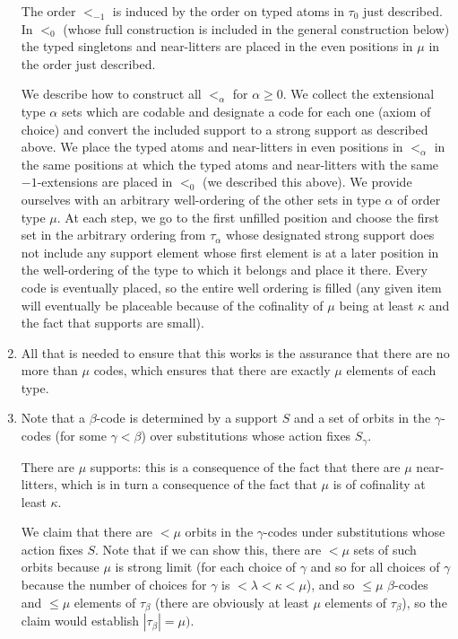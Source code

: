\documentclass[12pt]{article}
\begin{document}
\begin{enumerate}
The order $<_{-1}$
is induced by the order on typed atoms in $\tau_0$ just described.  In $<_0$ (whose full construction is included in the general construction below) the typed singletons and near-litters are placed in the even positions in $\mu$ in the order just described.

We describe how to construct all $<_\alpha$ for $\alpha\geq 0$.  We collect the extensional type $\alpha$ sets which are codable and designate a code for each one (axiom of choice) and convert the included support to a strong support as described above. We place the typed atoms and near-litters in even positions in $<_\alpha$ in the same positions at which the typed atoms and near-litters with the same $-1$-extensions are placed in
$<_0$ (we described this above).  We provide ourselves with an arbitrary well-ordering of the other sets in type $\alpha$ of order type $\mu$.  At each step, we go to the first unfilled position and choose the first set in the arbitrary ordering from $\tau_\alpha$ whose designated strong support does not include any support element whose first element is at a later position in the well-ordering of the type to which it belongs and place it there.  Every code is eventually placed, so the entire well ordering is filled (any given item will eventually be placeable because of the cofinality of $\mu$ being at least $\kappa$ and the fact that supports are small).

\item All that is needed to ensure that this works is the assurance that there are no more than $\mu$ codes, which ensures that there are exactly $\mu$ elements of each type.

\item  Note that a $\beta$-code is determined by a support $S$ and a set of orbits in the $\gamma$-codes (for some $\gamma<\beta$) over substitutions whose action fixes $S_\gamma$.

There are $\mu$ supports:  this is a consequence of the fact that there are $\mu$ near-litters, which is in turn a consequence of the fact that $\mu$ is of cofinality at least $\kappa$.

We claim that there are $<\mu$ orbits in the $\gamma$-codes under substitutions whose action fixes $S$.  Note that if we can show this, there are $<\mu$ sets of such orbits because $\mu$ is strong limit  (for each choice of $\gamma$ and so for all choices of $\gamma$ because the number of choices for $\gamma$ is $<\lambda<\kappa<\mu$), and so $\leq \mu$ $\beta$-codes and $\leq \mu$ elements of $\tau_\beta$ (there are obviously at least $\mu$ elements
of $\tau_\beta$), so the claim would establish $|\tau_\beta| = \mu)$.


\end{enumerate}
\end{document}
